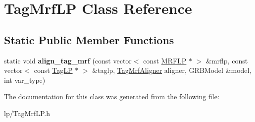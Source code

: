 \hypertarget{class_tag_mrf_l_p}{
\section{TagMrfLP Class Reference}
\label{class_tag_mrf_l_p}
}
\subsection*{Static Public Member Functions}
\begin{DoxyCompactItemize}
\item 
\hypertarget{class_tag_mrf_l_p_a7f9f963c533c5c712acca41db36f9a5a}{
static void {\bfseries align\_\-tag\_\-mrf} (const vector$<$ const \hyperlink{struct_m_r_f_l_p}{MRFLP} $\ast$ $>$ \&mrflp, const vector$<$ const \hyperlink{struct_scarab_1_1_h_g_1_1_tag_l_p}{TagLP} $\ast$ $>$ \&taglp, \hyperlink{class_tag_mrf_aligner}{TagMrfAligner} aligner, GRBModel \&model, int var\_\-type)}
\label{class_tag_mrf_l_p_a7f9f963c533c5c712acca41db36f9a5a}

\end{DoxyCompactItemize}


The documentation for this class was generated from the following file:\begin{DoxyCompactItemize}
\item 
lp/TagMrfLP.h\end{DoxyCompactItemize}
